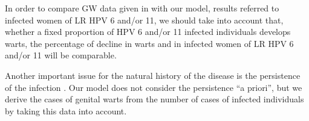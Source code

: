 In order to compare GW data given in \cite{ali2013genital} with our model, results referred to infected women of LR HPV 6 and/or 11, we should take into account that, whether a fixed proportion of HPV 6 and/or 11 infected individuals develops warts, the percentage of decline in warts and in infected women of LR HPV 6 and/or 11 will be comparable. 

Another important issue for the natural history of the disease is the persistence of the infection \cite{campos2014updated}. Our model does not consider the persistence ``a priori'', but we derive the cases of genital warts from the number of cases of infected individuals by taking this data into account.
